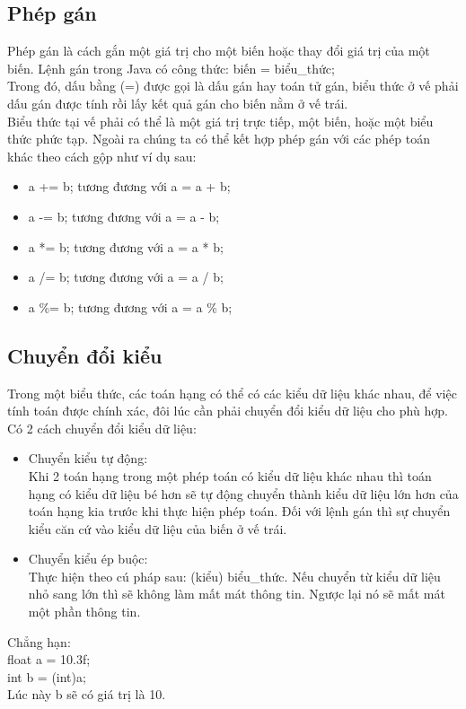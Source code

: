 \subsection{Phép gán}
\indent Phép gán là cách gắn một giá trị cho một biến hoặc thay đổi giá trị của một biến. Lệnh gán trong Java có công thức: {\ttfamily biến = biểu\_thức;}\\
\indent Trong đó, dấu bằng (=) được gọi là dấu gán hay toán tử gán, biểu thức ở vế phải dấu gán được tính rồi lấy kết quả gán cho biến nằm ở vế trái.\\
\indent Biểu thức tại vế phải có thể là một giá trị trực tiếp, một biến, hoặc một biểu thức phức tạp.
\indent Ngoài ra chúng ta có thể kết hợp phép gán với các phép toán khác theo cách gộp như ví dụ sau:
\begin{itemize}
\item a += b; tương đương với a = a + b;
\item a -= b; tương đương với a = a - b;
\item a *= b; tương đương với a = a * b;
\item a /= b; tương đương với a = a / b;
\item a \%= b; tương đương với a = a \% b;
\end{itemize}
\subsection{Chuyển đổi kiểu}
\indent Trong một biểu thức, các toán hạng có thể có các kiểu dữ liệu khác nhau, để việc tính toán được chính xác, đôi lúc cần phải chuyển đổi kiểu dữ liệu cho phù hợp. Có 2 cách chuyển đổi kiểu dữ liệu: 
\begin{itemize}
\item Chuyển kiểu tự động:\\
Khi 2 toán hạng trong một phép toán có kiểu dữ liệu khác nhau thì toán hạng có kiểu dữ liệu bé hơn sẽ tự động chuyển thành kiểu dữ liệu lớn hơn của toán hạng kia trước khi thực hiện phép toán. Đối với lệnh gán thì sự chuyển kiểu căn cứ vào kiểu dữ liệu của biến ở vế trái.
\item Chuyển kiểu ép buộc: \\
Thực hiện theo cú pháp sau: {\ttfamily (kiểu) biểu\_thức}. Nếu chuyển từ kiểu dữ liệu nhỏ sang lớn thì sẽ không làm mất mát thông tin. Ngược lại nó sẽ mất mát một phần thông tin.
\end{itemize}

\indent Chẳng hạn: \\
{\ttfamily
float a = 10.3f;\\
int b = (int)a;}\\
\indent Lúc này b sẽ có giá trị là 10.
